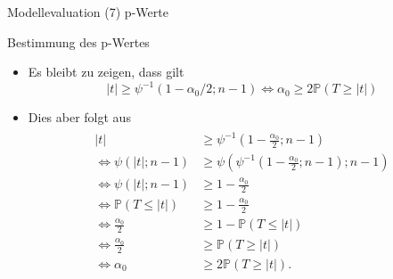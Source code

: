 \documentclass[
  8pt,
  ignorenonframetext,
]{beamer}
\begin{document}
\begin{frame}{Modellevaluation}
\protect\hypertarget{modellevaluation-16}{}
\noindent (7) p-Werte

\small

Bestimmung des p-Wertes \vspace{2mm}

\begin{itemize}
\item
  \itemsep2mm \justifying Es bleibt zu zeigen, dass gilt
  \begin{equation}
  |t| \ge \psi^{-1}(1 - \alpha_0/2; n-1)
  \Leftrightarrow
  \alpha_0 \ge 2 \mathbb{P}(T \ge |t|)
  \end{equation}
\item
  Dies aber folgt aus \footnotesize \vspace{-2mm} \begin{align}
  \begin{split}
  |t|
  & \ge \psi^{-1}\left(1 - \frac{\alpha_0}{2}; n-1\right)
  \\\Leftrightarrow
  \psi(|t|; n-1)
  & \ge \psi\left(\psi^{-1}\left(1 - \frac{\alpha_0}{2}; n-1\right); n-1\right)
  \\\Leftrightarrow
  \psi(|t|; n-1)
  & \ge 1 - \frac{\alpha_0}{2}
  \\\Leftrightarrow
  \mathbb{P}(T \le |t|)
  & \ge 1 - \frac{\alpha_0}{2}
  \\\Leftrightarrow
  \frac{\alpha_0}{2}
  & \ge 1 - \mathbb{P}(T \le |t|)
  \\\Leftrightarrow
  \frac{\alpha_0}{2}
  & \ge \mathbb{P}(T \ge |t|)
  \\\Leftrightarrow
  \alpha_0
  & \ge 2 \mathbb{P}(T \ge |t|).
  \end{split}
  \end{align}
\end{itemize}
\end{frame}
\end{document}
